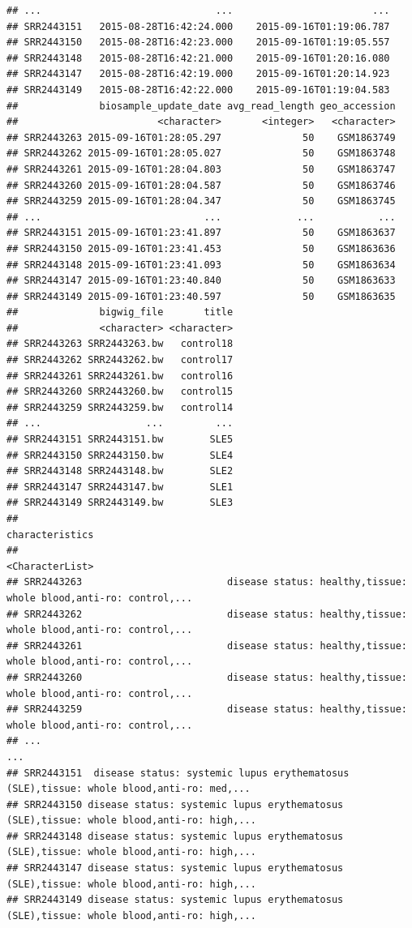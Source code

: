 \documentclass[9pt,a4paper,]{extarticle}
\begin{document}
\begin{verbatim}
## ...                              ...                        ...
## SRR2443151   2015-08-28T16:42:24.000    2015-09-16T01:19:06.787
## SRR2443150   2015-08-28T16:42:23.000    2015-09-16T01:19:05.557
## SRR2443148   2015-08-28T16:42:21.000    2015-09-16T01:20:16.080
## SRR2443147   2015-08-28T16:42:19.000    2015-09-16T01:20:14.923
## SRR2443149   2015-08-28T16:42:22.000    2015-09-16T01:19:04.583
##              biosample_update_date avg_read_length geo_accession
##                        <character>       <integer>   <character>
## SRR2443263 2015-09-16T01:28:05.297              50    GSM1863749
## SRR2443262 2015-09-16T01:28:05.027              50    GSM1863748
## SRR2443261 2015-09-16T01:28:04.803              50    GSM1863747
## SRR2443260 2015-09-16T01:28:04.587              50    GSM1863746
## SRR2443259 2015-09-16T01:28:04.347              50    GSM1863745
## ...                            ...             ...           ...
## SRR2443151 2015-09-16T01:23:41.897              50    GSM1863637
## SRR2443150 2015-09-16T01:23:41.453              50    GSM1863636
## SRR2443148 2015-09-16T01:23:41.093              50    GSM1863634
## SRR2443147 2015-09-16T01:23:40.840              50    GSM1863633
## SRR2443149 2015-09-16T01:23:40.597              50    GSM1863635
##              bigwig_file       title
##              <character> <character>
## SRR2443263 SRR2443263.bw   control18
## SRR2443262 SRR2443262.bw   control17
## SRR2443261 SRR2443261.bw   control16
## SRR2443260 SRR2443260.bw   control15
## SRR2443259 SRR2443259.bw   control14
## ...                  ...         ...
## SRR2443151 SRR2443151.bw        SLE5
## SRR2443150 SRR2443150.bw        SLE4
## SRR2443148 SRR2443148.bw        SLE2
## SRR2443147 SRR2443147.bw        SLE1
## SRR2443149 SRR2443149.bw        SLE3
##                                                                                     characteristics
##                                                                                     <CharacterList>
## SRR2443263                         disease status: healthy,tissue: whole blood,anti-ro: control,...
## SRR2443262                         disease status: healthy,tissue: whole blood,anti-ro: control,...
## SRR2443261                         disease status: healthy,tissue: whole blood,anti-ro: control,...
## SRR2443260                         disease status: healthy,tissue: whole blood,anti-ro: control,...
## SRR2443259                         disease status: healthy,tissue: whole blood,anti-ro: control,...
## ...                                                                                             ...
## SRR2443151  disease status: systemic lupus erythematosus (SLE),tissue: whole blood,anti-ro: med,...
## SRR2443150 disease status: systemic lupus erythematosus (SLE),tissue: whole blood,anti-ro: high,...
## SRR2443148 disease status: systemic lupus erythematosus (SLE),tissue: whole blood,anti-ro: high,...
## SRR2443147 disease status: systemic lupus erythematosus (SLE),tissue: whole blood,anti-ro: high,...
## SRR2443149 disease status: systemic lupus erythematosus (SLE),tissue: whole blood,anti-ro: high,...
\end{verbatim}
\end{document}
